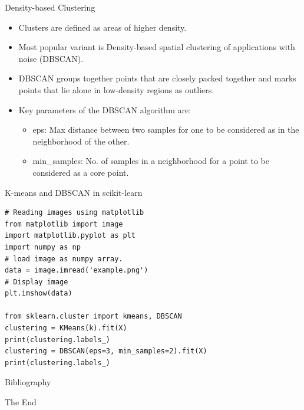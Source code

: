 \documentclass{beamer}
\begin{document}
\begin{frame}{Density-based Clustering}
    \begin{itemize}
        \item Clusters are defined as areas of higher density.
        \item Most popular variant is Density-based spatial clustering of applications with noise (DBSCAN).\cite{esterDensityBasedAlgorithmDiscovering}
        \item DBSCAN groups together points that are closely packed together and marks points that lie alone in low-density regions as outliers. 
        \item Key parameters of the DBSCAN algorithm are:
        \begin{itemize}
            \item eps: Max distance between two samples for one to be considered as in the neighborhood of the other. 
            \item min\_samples: No. of samples in a neighborhood for a point to be considered as a core point.
        \end{itemize}
    \end{itemize}
\end{frame}


\begin{frame}[fragile]{K-means and DBSCAN in scikit-learn}
\begin{verbatim}
# Reading images using matplotlib
from matplotlib import image
import matplotlib.pyplot as plt
import numpy as np
# load image as numpy array.
data = image.imread('example.png')
# Display image
plt.imshow(data)

from sklearn.cluster import kmeans, DBSCAN
clustering = KMeans(k).fit(X)
print(clustering.labels_)
clustering = DBSCAN(eps=3, min_samples=2).fit(X)
print(clustering.labels_)
\end{verbatim}
\end{frame}



\begin{frame}{Bibliography}
    
    
\end{frame}




\begin{frame}
    \Huge{\centerline{The End}}
\end{frame}
\end{document}
